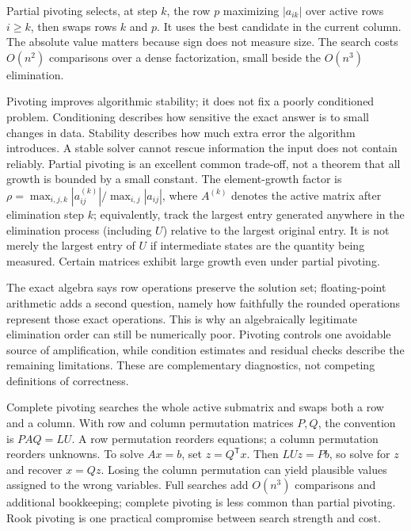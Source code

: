 Partial pivoting selects, at step \(k\), the row \(p\) maximizing \(|a_{ik}|\) over active rows \(i\ge k\), then swaps rows \(k\) and \(p\). It uses the best candidate in the current column. The absolute value matters because sign does not measure size. The search costs \(O(n^2)\) comparisons over a dense factorization, small beside the \(O(n^3)\) elimination.

Pivoting improves algorithmic stability; it does not fix a poorly conditioned problem. Conditioning describes how sensitive the exact answer is to small changes in data. Stability describes how much extra error the algorithm introduces. A stable solver cannot rescue information the input does not contain reliably. Partial pivoting is an excellent common trade-off, not a theorem that all growth is bounded by a small constant. The element-growth factor is \(\rho=\max_{i,j,k}|a_{ij}^{(k)}|/\max_{i,j}|a_{ij}|\), where \(A^{(k)}\) denotes the active matrix after elimination step \(k\); equivalently, track the largest entry generated anywhere in the elimination process (including \(U\)) relative to the largest original entry. It is not merely the largest entry of \(U\) if intermediate states are the quantity being measured. Certain matrices exhibit large growth even under partial pivoting.

The exact algebra says row operations preserve the solution set; floating-point arithmetic adds a second question, namely how faithfully the rounded operations represent those exact operations. This is why an algebraically legitimate elimination order can still be numerically poor. Pivoting controls one avoidable source of amplification, while condition estimates and residual checks describe the remaining limitations. These are complementary diagnostics, not competing definitions of correctness.

Complete pivoting searches the whole active submatrix and swaps both a row and a column. With row and column permutation matrices \(P,Q\), the convention is \(PAQ=LU\). A row permutation reorders equations; a column permutation reorders unknowns. To solve \(Ax=b\), set \(z=Q^\mathsf T x\). Then \(LUz=Pb\), so solve for \(z\) and recover \(x=Qz\). Losing the column permutation can yield plausible values assigned to the wrong variables. Full searches add \(O(n^3)\) comparisons and additional bookkeeping; complete pivoting is less common than partial pivoting. Rook pivoting is one practical compromise between search strength and cost.

